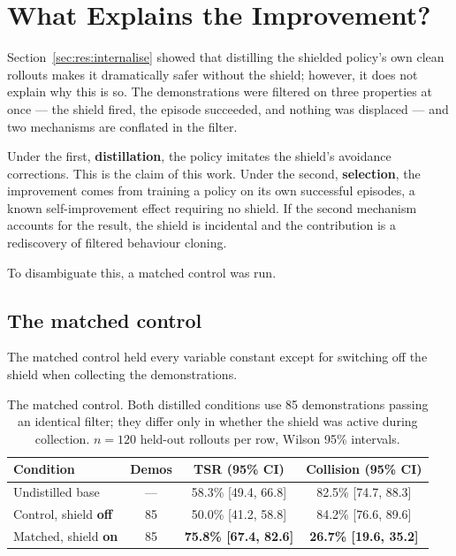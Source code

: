 \section{What Explains the Improvement?}\label{sec:res:mechanism}

Section~\ref{sec:res:internalise} showed that distilling the shielded policy's own clean rollouts
makes it dramatically safer without the shield; however, it does not explain why this is so. The
demonstrations were filtered on three properties at once --- the shield fired, the episode
succeeded, and nothing was displaced --- and two mechanisms are conflated in the filter.

Under the first, \textbf{distillation}, the policy imitates the shield's avoidance corrections.
This is the claim of this work. Under the second, \textbf{selection}, the improvement comes from
training a policy on its own successful episodes, a known self-improvement effect requiring no
shield. If the second mechanism accounts for the result, the shield is incidental and the contribution is a
rediscovery of filtered behaviour cloning.

To disambiguate this, a matched control was run.

\subsection*{The matched control}

The matched control held every variable constant except for switching off the shield when collecting the demonstrations.


\begin{table}[htbp]
\centering
\caption{The matched control. Both distilled conditions use 85 demonstrations passing an identical
  filter; they differ only in whether the shield was active during collection. $n = 120$ held-out
  rollouts per row, Wilson 95\% intervals.}
\label{tab:matched_control}
\begin{tabular}{lccc}
\toprule
\textbf{Condition} & \textbf{Demos} & \textbf{TSR (95\% CI)} & \textbf{Collision (95\% CI)} \\
\midrule
Undistilled base & ---            & 58.3\% [49.4, 66.8] & 82.5\% [74.7, 88.3] \\
Control, shield \textbf{off}  & 85 & 50.0\% [41.2, 58.8] & 84.2\% [76.6, 89.6] \\
Matched, shield \textbf{on}   & 85 & \textbf{75.8\% [67.4, 82.6]} & \textbf{26.7\% [19.6, 35.2]} \\
\bottomrule
\end{tabular}
\end{table}

